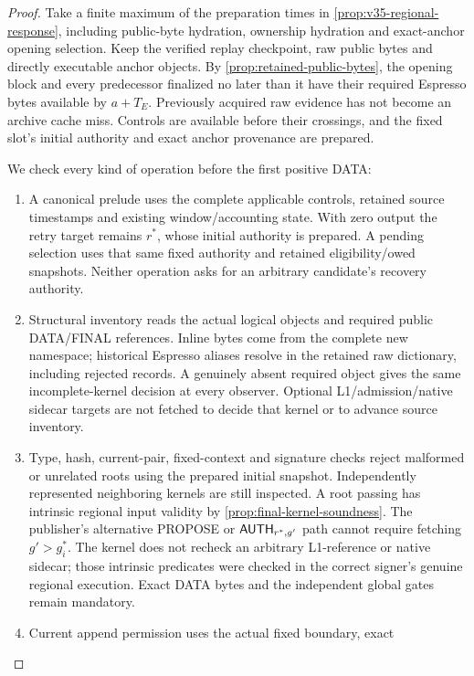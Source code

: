 \begin{proof}
Take a finite maximum of the preparation times in
\cref{prop:v35-regional-response}, including public-byte hydration,
ownership hydration and exact-anchor opening selection. Keep
the verified replay checkpoint, raw public bytes and directly executable
anchor objects. By \cref{prop:retained-public-bytes}, the opening block
and every predecessor finalized no later than it have their required
Espresso bytes available by $a+T_E$. Previously acquired raw evidence
has not become an archive cache miss. Controls are available before
their crossings, and the fixed slot's initial authority and exact anchor
provenance are prepared.

We check every kind of operation before the first positive DATA:
\begin{enumerate}[label=(\roman*),itemsep=2pt]
\item A canonical prelude uses the complete applicable controls,
retained source timestamps and existing window/accounting state. With
zero output the retry target remains $r^*$, whose initial authority
is prepared. A pending selection uses that same fixed authority and
retained eligibility/owed snapshots. Neither operation asks for an
arbitrary candidate's recovery authority.
\item Structural inventory reads the actual logical objects and
required public DATA/FINAL references. Inline bytes come from the
complete new namespace; historical Espresso aliases resolve in the
retained raw dictionary, including rejected records. A genuinely absent
required object gives the same incomplete-kernel decision at every
observer. Optional L1/admission/native sidecar targets are not fetched
to decide that kernel or to advance source inventory.
\item Type, hash, current-pair, fixed-context and signature checks
reject malformed or unrelated roots using the prepared initial snapshot.
Independently represented neighboring kernels are still inspected. A
root passing  has intrinsic regional input validity by
\cref{prop:final-kernel-soundness}. The publisher's alternative PROPOSE
or $\mathsf{AUTH}_{r^*,g'}$ path cannot require fetching $g'>g_i^*$.
The kernel does not recheck an arbitrary L1-reference or native sidecar;
those intrinsic predicates were checked in the correct signer's genuine
regional execution. Exact DATA bytes and the independent global gates
remain mandatory.
\item Current append permission uses the actual fixed boundary, exact

\end{enumerate}
\end{proof}
